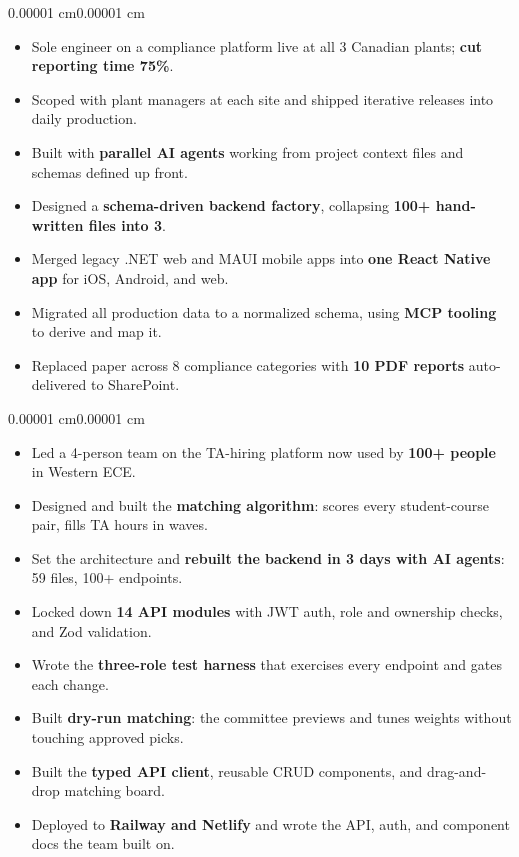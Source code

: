 \documentclass[letterpaper]{article}
\newenvironment{highlights}{
    \begin{itemize}[
        topsep=0.115 cm,
        parsep=0.106 cm,
        partopsep=0pt,
        itemsep=0pt,
        leftmargin=10pt
    ]
}{
    \end{itemize}
}
\newenvironment{onecolentry}{
    \begin{adjustwidth}{0.00001 cm}{0.00001 cm}
}{
    \end{adjustwidth}
}
\begin{document}
    \begin{onecolentry}
        \begin{highlights}
            \item Sole engineer on a compliance platform live at all 3 Canadian plants; \textbf{cut reporting time 75\%}.
            \item Scoped with plant managers at each site and shipped iterative releases into daily production.
            \item Built with \textbf{parallel AI agents} working from project context files and schemas defined up front.
            \item Designed a \textbf{schema-driven backend factory}, collapsing \textbf{100+ hand-written files into 3}.
            \item Merged legacy .NET web and MAUI mobile apps into \textbf{one React Native app} for iOS, Android, and web.
            \item Migrated all production data to a normalized schema, using \textbf{MCP tooling} to derive and map it.
            \item Replaced paper across 8 compliance categories with \textbf{10 PDF reports} auto-delivered to SharePoint.
        \end{highlights}
    \end{onecolentry}

    \vspace{0.246 cm}

    \begin{onecolentry}
        \begin{highlights}
            \item Led a 4-person team on the TA-hiring platform now used by \textbf{100+ people} in Western ECE.
            \item Designed and built the \textbf{matching algorithm}: scores every student-course pair, fills TA hours in waves.
            \item Set the architecture and \textbf{rebuilt the backend in 3 days with AI agents}: 59 files, 100+ endpoints.
            \item Locked down \textbf{14 API modules} with JWT auth, role and ownership checks, and Zod validation.
            \item Wrote the \textbf{three-role test harness} that exercises every endpoint and gates each change.
            \item Built \textbf{dry-run matching}: the committee previews and tunes weights without touching approved picks.
            \item Built the \textbf{typed API client}, reusable CRUD components, and drag-and-drop matching board.
            \item Deployed to \textbf{Railway and Netlify} and wrote the API, auth, and component docs the team built on.
        \end{highlights}
    \end{onecolentry}
\end{document}
